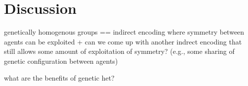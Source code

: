 \section{Discussion}

genetically homogenous groups == indirect encoding where symmetry between agents can be exploited
+ can we come up with another indrect encoding that still allows some amount of exploitation of symmetry? (e.g., some sharing of genetic configuration between agents)

what are the benefits of genetic het?
